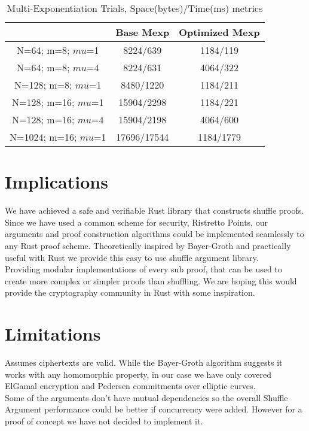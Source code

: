 \documentclass[12pt,a4paper]{report}
\begin{document}
\begin{table}
	\begin{center}
	\begin{tabular}{||c|c|c||}\hline
		\backslashbox{Parameters}{Proof Type} & Base Mexp& Optimized Mexp\\
		\hline
		N=64; m=8; $mu$=1 & 8224/639 & 1184/119\\
		\hline
		N=64; m=8; $mu$=4 & 8224/631 & 4064/322 \\
		\hline
		N=128; m=8; $mu$=1 & 8480/1220 & 1184/211\\
		\hline
		N=128; m=16; $mu$=1 & 15904/2298 & 1184/221\\
		\hline
		N=128; m=16; $mu$=4 & 15904/2198 & 4064/600\\
		\hline
		N=1024; m=16; $mu$=1 & 17696/17544 & 1184/1779\\
		\hline
	\end{tabular}
	\end{center}
	\caption{Multi-Exponentiation Trials, Space(bytes)/Time(ms) metrics}
	\label{table:mexp}
\end{table}

\section{Implications}
We have achieved a safe and verifiable Rust library that constructs shuffle proofs.
Since we have used a common scheme for security, Ristretto Points, our arguments and proof construction algorithms could be implemented seamlessly to any Rust proof scheme.
Theoretically inspired by Bayer-Groth and practically useful with Rust we provide this easy to use shuffle argument library.\\
Providing modular implementations of every sub proof, that can be used to create more complex or simpler proofs than shuffling.
We are hoping this would provide the cryptography community in Rust with some inspiration.
\section{Limitations}
Assumes ciphertexts are valid.
While the Bayer-Groth algorithm suggests it works with any homomorphic property,
in our case we have only covered ElGamal encryption and Pedersen commitments over elliptic curves.\\
Some of the arguments don't have mutual dependencies so the overall Shuffle Argument performance
could be better if concurrency were added. However for a proof of concept we have not decided to implement it.
\end{document}
